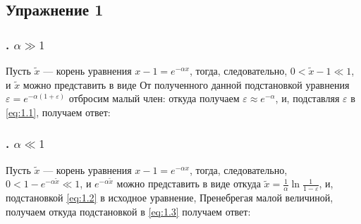\def \picdir{pic/}

\subsection*{Упражнение 1}
\subsubsection*{. $\alpha \gg 1$}
Пусть $\tilde{x}$ --- корень уравнения $x-1 = e^{-\alpha x}$, тогда,
следовательно, $0 < \tilde{x} - 1 \ll 1$, и $\tilde{x}$ можно представить в виде
От полученного данной подстановкой уравнения $\varepsilon = e^{-\alpha(1 + \varepsilon)}$ отбросим малый член:
откуда получаем $\varepsilon \approx e^{-\alpha}$, и, подставляя $\varepsilon$ в \eqref{eq:1.1}, получаем ответ:
\subsubsection*{. $\alpha \ll 1$}
Пусть $\tilde{x}$ --- корень уравнения $x-1 = e^{-\alpha x}$, тогда,
следовательно, $0 < 1 - e^{-\alpha \tilde{x}} \ll 1$, и $e^{-\alpha \tilde{x}}$ можно представить в виде
откуда $\tilde{x} = \frac{1}{\alpha}\ln{\frac{1}{1 - \varepsilon}}$, и, подстановкой \eqref{eq:1.2} в исходное уравнение,
Пренебрегая малой величиной, получаем
откуда подстановкой в \eqref{eq:1.3} получаем ответ:
